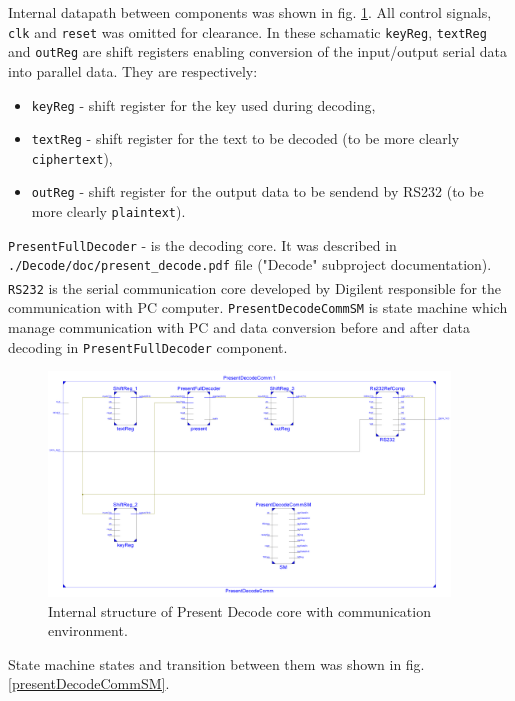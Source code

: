\documentclass{gajewski}
\begin{document}
Internal datapath between components was shown in fig. \ref{pdecinside}. All control signals, \texttt{clk} and \texttt{reset} was omitted for clearance. In these schamatic \texttt{keyReg}, \texttt{textReg} and \texttt{outReg} are shift registers enabling conversion of the input/output serial data into parallel data. They are respectively:
\begin{itemize}
    \item \texttt{keyReg} - shift register for the key used during decoding,
    \item \texttt{textReg} - shift register for the text to be decoded (to be more clearly \texttt{ciphertext}),
    \item \texttt{outReg} - shift register for the output data to be sendend by RS232 (to be more clearly \texttt{plaintext}).
\end{itemize}
\texttt{PresentFullDecoder} - is the decoding core. It was described in \texttt{./Decode/doc/present\_decode.pdf} file ("Decode" subproject documentation). \texttt{RS232} is the serial communication core developed by Digilent\textsuperscript{\textregistered} responsible for the communication with PC computer.
\texttt{PresentDecodeCommSM} is state machine which manage communication with PC and data conversion before and after data decoding in \texttt{PresentFullDecoder} component.

\begin{figure}[!ht]%
    \begin{center}
    \includegraphics[width=0.95\textwidth]{img/PresentDecodeCommInside.png}
    \caption{%
        Internal structure of Present Decode core with communication environment. 
     }%
    \label{pdecinside}
    \end{center}
 \end{figure}

State machine states and transition between them was shown in fig. \ref{presentDecodeCommSM}.
\end{document}
